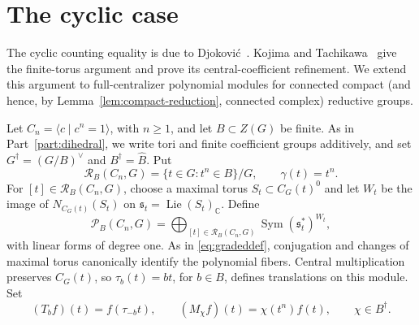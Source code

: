 \documentclass[11pt,a4paper,reqno]{amsart}
\theoremstyle{plain}
\theoremstyle{definition}
\theoremstyle{remark}
\numberwithin{equation}{section}
\DeclareMathOperator{\Lie}{Lie}
\DeclareMathOperator{\Sym}{Sym}
\newcommand{\CC}{\mathbb C}
\newcommand{\cP}{\mathcal P}
\newcommand{\cR}{\mathcal R}
\begin{document}
\section{The cyclic case}\label{sec:cyclic}

The cyclic counting equality is due to Djokovi\'c~\cite[Theorem~1]{djokovic}. Kojima and Tachikawa~\cite[Theorems~2.1 and~2.2]{kojima-tachikawa} give the finite-torus argument and prove its central-coefficient refinement. We extend this argument to full-centralizer polynomial modules for connected compact (and hence, by Lemma~\ref{lem:compact-reduction}, connected complex) reductive groups.

Let $C_n=\langle c\mid c^n=1\rangle$, with $n\ge1$, and let $B\subset Z(G)$ be finite. As in Part~\ref{part:dihedral}, we write tori and finite coefficient groups additively, and set $G^\dagger=(G/B)^\vee$ and $B^\dagger=\widehat B$. Put
\begin{equation}\label{eq:cyclic-classes}
\cR_B(C_n,G)=\{t\in G:t^n\in B\}/G,
\qquad \gamma(t)=t^n.
\end{equation}
For $[t]\in\cR_B(C_n,G)$, choose a maximal torus $S_t\subset C_G(t)^0$ and let $W_t$ be the image of $N_{C_G(t)}(S_t)$ on $\mathfrak s_t=\Lie(S_t)_{\CC}$. Define
\begin{equation}\label{eq:cyclic-classes-mods}
\cP_B(C_n,G)=\bigoplus_{[t]\in\cR_B(C_n,G)}
\Sym(\mathfrak s_t^*)^{W_t},
\end{equation}
with linear forms of degree one. As in \eqref{eq:gradeddef}, conjugation and changes of maximal torus canonically identify the polynomial fibers. Central multiplication preserves $C_G(t)$, so $\tau_b(t)=bt$, for $b\in B$, defines translations on this module. Set
\begin{equation}\label{eq:cyclic-operators}
(T_bf)(t)=f(\tau_{-b}t),\qquad
(M_\chi f)(t)=\chi(t^n)f(t),\qquad \chi\in B^\dagger.
\end{equation}
\end{document}
